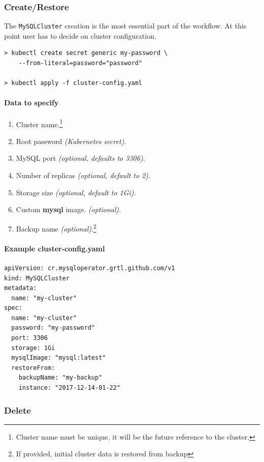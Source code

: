 \subsubsection*{Create/Restore}

The \texttt{MySQLCluster} creation is the most essential part of the 
workflow. At this point user has to decide on cluster configuration.

\begin{lstlisting}
> kubectl create secret generic my-password \
	--from-literal=password="password"

> kubectl apply -f cluster-config.yaml
\end{lstlisting}

\paragraph{Data to specify}
\begin{enumerate}
	\item Cluster name.\footnote{Cluster name must be unique, it will be the future reference
	to the cluster.}
	\item Root password \textit{(Kubernetes secret)}.
	\item MySQL port \textit{(optional, defaults to 3306)}.
	\item Number of replicas \textit{(optional, default to 2)}.
	\item Storage size \textit{(optional, default to 1Gi)}.
	\item Custom \textbf{mysql} image. \textit{(optional)}.
	\item Backup name \textit{(optional)}.\footnote{If provided, initial cluster data is restored
	from backup}
\end{enumerate}

\paragraph{Example \textbf{cluster-config.yaml}}
\begin{lstlisting}[caption=cluster-config.yaml,captionpos=b]
apiVersion: cr.mysqloperator.grtl.github.com/v1
kind: MySQLCluster
metadata:
  name: "my-cluster"
spec:
  name: "my-cluster"
  password: "my-password"
  port: 3306
  storage: 1Gi
  mysqlImage: "mysql:latest"
  restoreFrom: 
	backupName: "my-backup"
	instance: "2017-12-14-01-22"
\end{lstlisting}

\subsubsection*{Delete}

